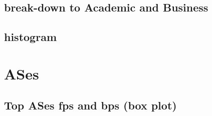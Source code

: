 \documentclass[10pt, journal, letterpaper]{IEEEtran}
\begin{document}
\subsection{break-down to Academic and Business}
\subsection{histogram}

\section{ASes}
\subsection{Top ASes fps and bps (box plot)}
\end{document}
